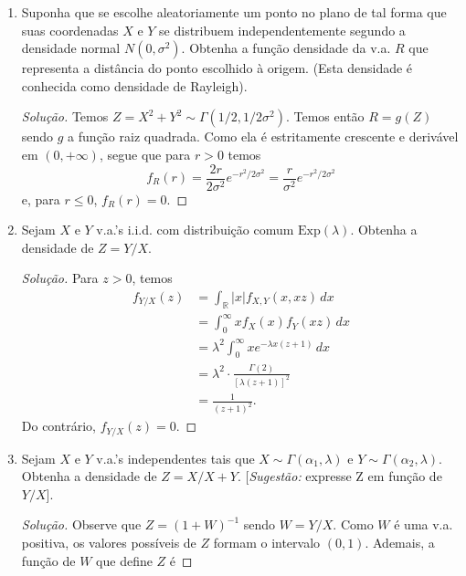 \documentclass[../Notas.tex]{subfiles}
\begin{document}
\begin{enumerate}
\begin{proof}[Solução]
        Do exercício 7b, temos $X_i^2\sim\text{Gama}(1/2, 1/2)$ para $i=1,\dots,n$. Do exercício 5b,
        temos $\sum_i X^2_i \sim \text{Gama}(n/2, 1/2)$.
    \end{proof}
    \item Suponha que se escolhe aleatoriamente um ponto no plano de tal forma que suas coordenadas $X$ e $Y$ se distribuem independentemente segundo a densidade normal $N(0, \sigma^2)$. Obtenha a função densidade da v.a. $R$ que representa a distância do ponto escolhido à origem. (Esta densidade é conhecida como densidade de Rayleigh).
    \begin{proof}[Solução]
        Temos $Z = X^2 + Y^2 \sim\Gamma(1/2, 1/2\sigma^2)$. Temos então $R = g(Z)$ sendo $g$ a 
        função raiz quadrada. Como ela é estritamente crescente e derivável em $(0, +\infty)$,
        segue que para $r>0$ temos
        \[
        f_R(r) = \frac{2r}{2\sigma^2}e^{-r^2/2\sigma^2} = \frac{r}{\sigma^2}e^{-r^2/2\sigma^2}
        \]
        e, para $r\leq 0$, $f_R(r) = 0$.
    \end{proof}
    \item Sejam $X$ e $Y$ v.a.’s i.i.d. com distribuição comum $\text{Exp}(\lambda)$. Obtenha a densidade de $Z = Y/X$.
    \begin{proof}[Solução]
        Para $z>0$, temos
        \begin{align*}
            f_{Y/X}(z) &= \int_{\mathbb{R}} |x|f_{X,Y}(x,xz) \, dx \\
                       &= \int_0^{\infty} xf_X(x)f_Y(xz) \, dx \\
                       &= \lambda^2\int_0^{\infty} xe^{-\lambda x(z+1)} \, dx \\
                       &= \lambda^2\cdot\frac{\Gamma(2)}{[\lambda(z+1)]^2} \\
                       &= \frac{1}{(z+1)^2}.
        \end{align*}
        Do contrário, $f_{Y/X}(z) = 0.$
    \end{proof}
    \item Sejam $X$ e $Y$ v.a.’s independentes tais que $X\sim\Gamma(\alpha_1, \lambda)$ e $Y\sim\Gamma(\alpha_2,\lambda)$. Obtenha a densidade de $Z = X/X+Y$. [\textit{Sugestão:} expresse Z em função de $Y/X$].
    \begin{proof}[Solução]
        Observe que $Z = (1+W)^{-1}$ sendo $W = Y/X$. Como $W$ é uma v.a. positiva, os valores
        possíveis de $Z$ formam o intervalo $(0,1)$. Ademais, a função de $W$ que define $Z$ é

\end{proof}
\end{enumerate}
\end{document}
